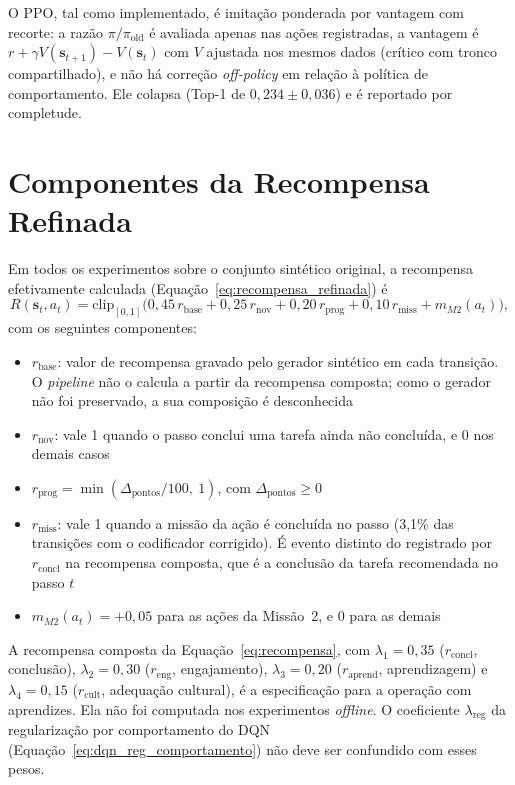 O PPO, tal como implementado, é imitação ponderada por vantagem com recorte: a razão $\pi/\pi_{\text{old}}$ é avaliada apenas nas ações registradas, a vantagem é $r + \gamma V(\mathbf{s}_{t+1}) - V(\mathbf{s}_t)$ com $V$ ajustada nos mesmos dados (crítico com tronco compartilhado), e não há correção \textit{off-policy} em relação à política de comportamento. Ele colapsa (Top-1 de $0{,}234 \pm 0{,}036$) e é reportado por completude.

\section*{Componentes da Recompensa Refinada}

Em todos os experimentos sobre o conjunto sintético original, a recompensa efetivamente calculada (Equação~\ref{eq:recompensa_refinada}) é
\[
R(\mathbf{s}_t, a_t) = \mathrm{clip}_{[0,1]}\bigl(0{,}45\, r_{\text{base}} + 0{,}25\, r_{\text{nov}} + 0{,}20\, r_{\text{prog}} + 0{,}10\, r_{\text{miss}} + m_{M2}(a_t)\bigr),
\]
com os seguintes componentes:

\begin{itemize}
    \item $r_{\text{base}}$: valor de recompensa gravado pelo gerador sintético em cada transição. O \textit{pipeline} não o calcula a partir da recompensa composta; como o gerador não foi preservado, a sua composição é desconhecida
    \item $r_{\text{nov}}$: vale 1 quando o passo conclui uma tarefa ainda não concluída, e 0 nos demais casos
    \item $r_{\text{prog}} = \min(\Delta_{\text{pontos}}/100,\ 1)$, com $\Delta_{\text{pontos}} \geq 0$
    \item $r_{\text{miss}}$: vale 1 quando a missão da ação é concluída no passo (3,1\% das transições com o codificador corrigido). É evento distinto do registrado por $r_{\text{concl}}$ na recompensa composta, que é a conclusão da tarefa recomendada no passo $t$
    \item $m_{M2}(a_t) = +0{,}05$ para as ações da Missão~2, e 0 para as demais
\end{itemize}

\noindent A recompensa composta da Equação~\ref{eq:recompensa}, com $\lambda_1 = 0{,}35$ ($r_{\text{concl}}$, conclusão), $\lambda_2 = 0{,}30$ ($r_{\text{eng}}$, engajamento), $\lambda_3 = 0{,}20$ ($r_{\text{aprend}}$, aprendizagem) e $\lambda_4 = 0{,}15$ ($r_{\text{cult}}$, adequação cultural), é a especificação para a operação com aprendizes. Ela não foi computada nos experimentos \textit{offline}. O coeficiente $\lambda_{\text{reg}}$ da regularização por comportamento do DQN (Equação~\ref{eq:dqn_reg_comportamento}) não deve ser confundido com esses pesos.

